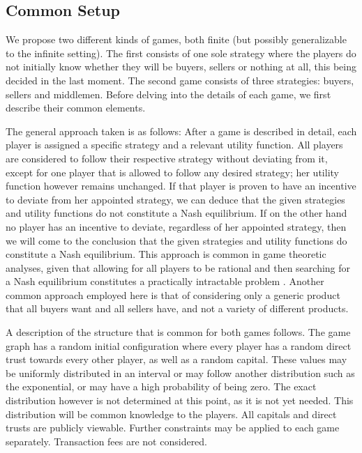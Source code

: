 \subsection{Common Setup}
  We propose two different kinds of games, both finite (but possibly generalizable to the infinite setting). The first
  consists of one sole strategy where the players do not initially know whether they will be buyers, sellers or nothing at
  all, this being decided in the last moment. The second game consists of three strategies: buyers, sellers and middlemen.
  Before delving into the details of each game, we first describe their common elements.
  
  The general approach taken is as follows: After a game is described in detail, each player is assigned a specific strategy and
  a relevant utility function. All players are considered to follow their respective strategy without deviating from it, except
  for one player that is allowed to follow any desired strategy; her utility function however remains unchanged. If that player
  is proven to have an incentive to deviate from her appointed strategy, we can deduce that the given strategies and utility
  functions do not constitute a Nash equilibrium. If on the other hand no player has an incentive to deviate, regardless of
  her appointed strategy, then we will come to the conclusion that the given strategies and utility functions do constitute a
  Nash equilibrium. This approach is common in game theoretic analyses, given that allowing for all players to be rational and
  then searching for a Nash equilibrium constitutes a practically intractable problem \cite{nasheqcomp}. Another common
  approach employed here is that of considering only a generic product that all buyers want and all sellers have, and not a
  variety of different products.

  A description of the structure that is common for both games follows. The game graph has a random initial configuration
  where every player has a random direct trust towards every other player, as well as a random capital. These values may be
  uniformly distributed in an interval or may follow another distribution such as the exponential, or may have a high
  probability of being zero. The exact distribution however is not determined at this point, as it is not yet needed. This
  distribution will be common knowledge to the players. All capitals and direct trusts are publicly viewable. Further
  constraints may be applied to each game separately.  Transaction fees are not considered.
  
